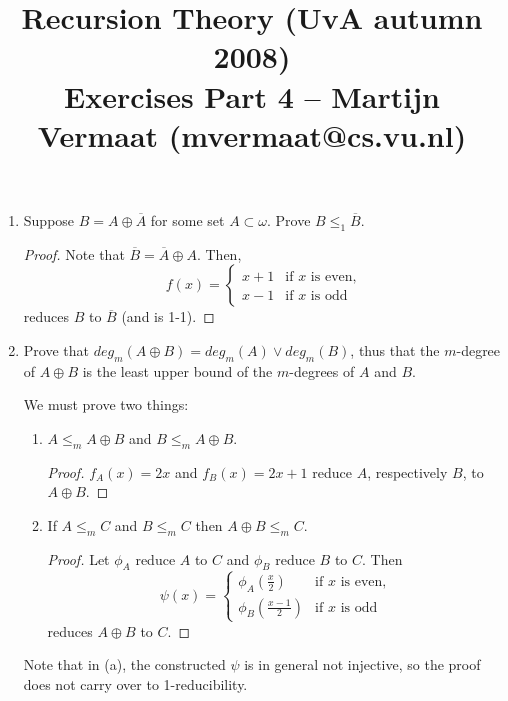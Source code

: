 \documentclass[a4paper,11pt]{article}
\title{Recursion Theory (UvA autumn 2008)\\
\normalsize{Exercises Part 4 -- Martijn Vermaat (mvermaat@cs.vu.nl)}}
\date{}
\begin{document}
\maketitle


\begin{enumerate}


\item %
Suppose $B = A \oplus \overline{A}$ for some set $A \subset \omega$. Prove $B \leq_1 \overline{B}$.

\begin{proof}
Note that $\overline{B} = \overline{A} \oplus A$. Then,
\begin{equation*}
  f(x) = \begin{cases}
    x + 1 & \text{if $x$ is even,}\\
    x - 1 & \text{if $x$ is odd}
  \end{cases}
\end{equation*}
reduces $B$ to $\overline{B}$ (and is 1-1).
\end{proof}


\item %
Prove that $deg_m(A \oplus B) = deg_m(A) \vee deg_m(B)$, thus that the $m$-degree of $A \oplus B$
is the least upper bound of the $m$-degrees of $A$ and $B$.

We must prove two things:

\begin{enumerate}
\item $A \leq_m A \oplus B$ and $B \leq_m A \oplus B$.
\begin{proof}
$f_A(x) = 2x$ and $f_B(x) = 2x + 1$ reduce $A$, respectively $B$, to $A \oplus B$.
\end{proof}

\item If $A \leq_m C$ and $B \leq_m C$ then $A \oplus B \leq_m C$.
\begin{proof}
Let $\phi_A$ reduce $A$ to $C$ and $\phi_B$ reduce $B$ to $C$. Then
\begin{equation*}
  \psi(x) = \begin{cases}
    \phi_A(\frac{x}{2})   & \text{if $x$ is even,}\\
    \phi_B(\frac{x-1}{2}) & \text{if $x$ is odd}
  \end{cases}
\end{equation*}
reduces $A \oplus B$ to $C$.
\end{proof}
\end{enumerate}
Note that in (a), the constructed $\psi$ is in general not injective, so the
proof does not carry over to 1-reducibility.



\end{enumerate}
\end{document}
